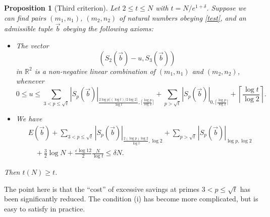 \documentclass[12pt,a4paper,reqno]{amsart}
\numberwithin{equation}{section}
\theoremstyle{plain}
\newtheorem{proposition}[theorem]{Proposition}
\theoremstyle{definition}
\newcommand\R{\mathbb{R}}
\newcommand\eps{\varepsilon}
\begin{document}
\begin{proposition}[Third criterion]  Let $2 \leq t \leq N$ with $t = N /e^{1+\delta}$.  Suppose we can find pairs $(m_1,n_1)$, $(m_2,n_2)$ of natural numbers obeying \eqref{test}, and an admissible tuple $\vec b$ obeying the following axioms:
  \begin{itemize}
    \item[(i)]  The vector
  \begin{equation}\label{svec-2}
    (S_2(\vec b)-u, S_3(\vec b))
  \end{equation}
  in $\R^2$ is a non-negative linear combination of $(m_1,n_1)$ and $(m_2,n_2)$, whenever
  $$ 0 \leq u \leq \sum_{3 < p \leq \sqrt{t}} |S_p(\vec b)|_{\frac{2 \log p \lceil (\log t)/2\log 2 \rceil}{\log t}, \lceil \frac{\log p}{\log 2} \rceil} + \sum_{p>\sqrt{t}} |S_p(\vec b)|_{0,\lceil \frac{\log p}{\log 2} \rceil} + \left\lceil \frac{\log t}{\log 2} \right\rceil.$$
    \item[(ii)]  We have
    \begin{equation}\label{main-3}
      \begin{split} 
  &    E(\vec b) + \sum_{3 < p \leq \sqrt{t}} |S_p(\vec b)|_{\frac{2(\log p) \log 2}{\log t}, \log 2} + \sum_{p>\sqrt{t}} |S_p(\vec b)|_{\log p,\log 2} \\
  & \quad + \frac{3}{2} \log N + \frac{\eps \log 12}{2} \frac{N}{\log t} \leq \delta N.
      \end{split}
    \end{equation}
  \end{itemize}
  Then $t(N) \geq t$.
  \end{proposition}
  
The point here is that the ``cost'' of excessive savings at primes $3 < p \leq \sqrt{t}$ has been significantly reduced.  The condition (i) has become more complicated, but is easy to satisfy in practice.
\end{document}
